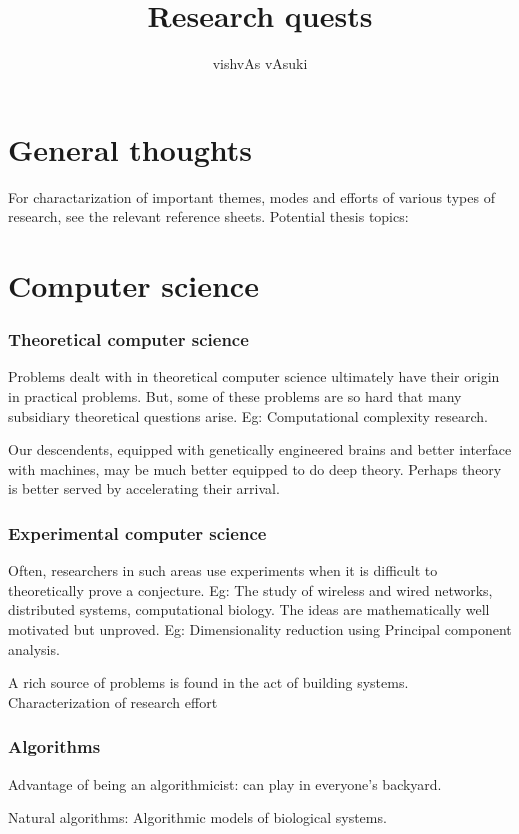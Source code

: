 \documentclass{article}
\title{Research quests}
\author{vishvAs vAsuki}
\begin{document}
\maketitle
\part{General thoughts}

For charactarization of important themes, modes and efforts of various types of research, see the relevant reference sheets.
Potential thesis topics:

\part{Computer science}
\section{Theoretical computer science}
Problems dealt with in theoretical computer science ultimately have their origin in practical problems. But, some of these problems are so hard that many subsidiary theoretical questions arise. Eg: Computational complexity research.

Our descendents, equipped with genetically engineered brains and better interface with machines, may be much better equipped to do deep theory. Perhaps theory is better served by accelerating their arrival.

\section{Experimental computer science}

Often, researchers in such areas use experiments when it is difficult to theoretically prove a conjecture. Eg: The study of wireless and wired networks, distributed systems, computational biology. The ideas are mathematically well motivated but unproved. Eg: Dimensionality reduction using Principal component analysis.

A rich source of problems is found in the act of building systems.
Characterization of research effort

\section{Algorithms}
Advantage of being an algorithmicist: can play in everyone's backyard.

Natural algorithms: Algorithmic models of biological systems.
\end{document}
